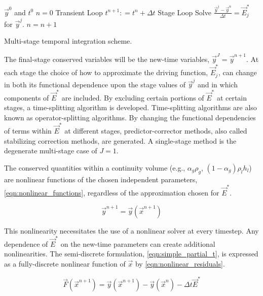 \begin{algo}[ht!]
\setlength{\baselineskip}{0.625\baselineskip}
\begin{algorithmic}[1]
\Require $\vec{y}^{0}$ and $t^{0}$
\Set $n = 0$
\Loop \; Transient Loop
    \State $t^{n+1} : = t^{n} + \Delta t$
     \; Stage Loop
		\BlackBox Solve $\displaystyle \frac{\vec{y}^{j} - \vec{y}^{n}}{\Delta t} =  \vec{E}_{j}^{*}$ for $\vec{y}^{j}$.
	\EndFor
	\State $n = n + 1$
\EndLoop
\end{algorithmic}
\caption{Multi-stage temporal integration scheme.}
\label{alg:single_stage_temporal}
\end{algo}

The final-stage conserved variables will be the new-time variables, $\vec{y}^{J} = \vec{y}^{n+1}$. 
At each stage the choice of how to approximate the driving function, $\vec{E}_{j}^{*}$, can change in both its functional dependence upon the stage values of $\vec{y}^{j}$ and in which components of $\vec{E}^{*}$ are included.
By excluding certain portions of $\vec{E}^{*}$ at certain stages, a time-splitting algorithm is developed.
Time-splitting algorithms are also known as operator-splitting algorithms. 
By changing the functional dependencies of terms within $\vec{E}^{*}$ at different stages, predictor-corrector methods, also called stabilizing correction methods, are generated. 
A single-stage method is the degenerate multi-stage case of $J = 1$.

The conserved quantities within a continuity volume (e.g., $\alpha_g \rho_g$, $\left(1-\alpha_g\right)\rho_l h_l$) are nonlinear functions of the chosen independent parameters, \eqref{eqn:nonlinear_functions}, regardless of the approximation chosen for $\vec{E}^{*}$.

\begin{equation}
\label{eqn:nonlinear_functions}
\vec{y}^{n+1} = \vec{y}(\vec{x}^{n+1})
\end{equation}

This nonlinearity necessitates the use of a nonlinear solver at every timestep.
Any dependence of $\vec{E}^{*}$ on the new-time parameters can create additional nonlinearities.
The semi-discrete formulation, \eqref{eqn:simple_partial_t}, is expressed as a fully-discrete nonlinear function of $\vec{x}$ by \eqref{eqn:nonlinear_residuals}.

\begin{equation}
\label{eqn:nonlinear_residuals}
\vec{F}(\vec{x}^{n+1}) = \vec{y}(\vec{x}^{n+1}) - \vec{y}(\vec{x}^n) -\Delta t \vec{E}^{*}
\end{equation}

